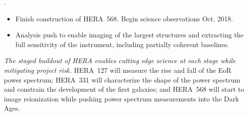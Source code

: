 \documentclass[preprint]{aastex}
\begin{document}
\vspace{-7pt}
.
\begin{itemize}\setlength{\parskip}{0pt}\itemsep0pt
\vspace{-7pt}
  \item Finish construction of HERA~568. Begin science observations Oct. 2018.
  \item Analysis push to enable imaging of the largest structures and extracting the full sensitivity of 
the instrument, including partially coherent baselines. 
\end{itemize}

\vspace{-8pt}
\noindent
{\it The staged buildout of HERA enables cutting edge science at each stage while
mitigating project risk.}
HERA~127 will measure the rise and fall of the EoR power spectrum; HERA~331
will characterize the shape of the power spectrum and constrain the development
of the first galaxies; and HERA~568 will start to image reionization while
pushing power spectrum measurements into the Dark Ages.
\end{document}
